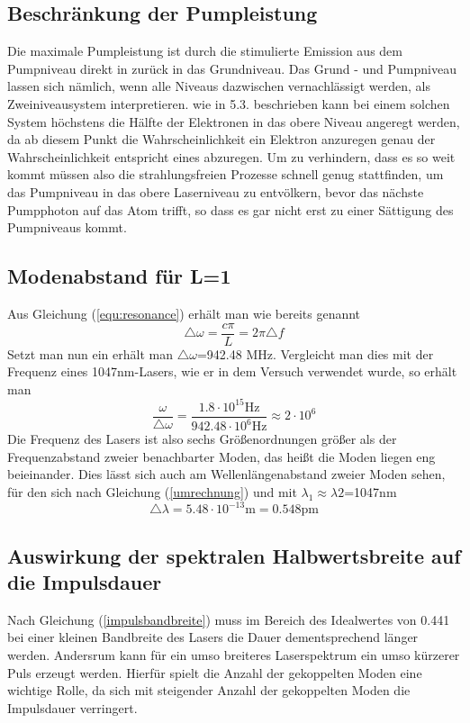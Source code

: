\subsection{Beschränkung der Pumpleistung}
Die maximale Pumpleistung ist durch die stimulierte Emission aus dem Pumpniveau direkt in zurück in das Grundniveau. Das Grund - und Pumpniveau lassen sich nämlich, wenn alle Niveaus dazwischen vernachlässigt werden, als Zweiniveausystem interpretieren. wie in 5.3. beschrieben kann bei einem solchen System höchstens die Hälfte der Elektronen in das obere Niveau angeregt werden, da ab diesem Punkt die Wahrscheinlichkeit ein Elektron anzuregen genau der Wahrscheinlichkeit entspricht eines abzuregen. \newline
Um zu verhindern, dass es so weit kommt müssen also die strahlungsfreien Prozesse schnell genug stattfinden, um das Pumpniveau in das obere Laserniveau zu entvölkern, bevor das nächste Pumpphoton auf das Atom trifft, so dass es gar nicht erst zu einer Sättigung des Pumpniveaus kommt. 
\subsection{Modenabstand für L=1}
Aus Gleichung (\ref{equ:resonance}) erhält man wie bereits genannt
\begin{equation*}
	\triangle\omega=\frac{c\pi}{L}=2\pi\triangle f
\end{equation*}
Setzt man nun ein erhält man $\triangle\omega$=942.48 MHz. Vergleicht man dies mit der Frequenz eines 1047nm-Lasers, wie er in dem Versuch verwendet wurde, so erhält man
\begin{equation*}
\frac{\omega}{\triangle\omega}=\frac{1.8\cdot10^{15}\text{Hz}}{942.48\cdot10^6 \text{Hz}}\approx2\cdot10^6
\end{equation*}
Die Frequenz des Lasers ist also sechs Größenordnungen größer als der Frequenzabstand zweier benachbarter Moden, das heißt die Moden liegen eng beieinander. Dies lässt sich auch am Wellenlängenabstand zweier Moden sehen, für den sich nach Gleichung (\ref{umrechnung}) und mit $\lambda_1\approx\lambda2$=1047nm
\begin{equation*}
\triangle\lambda=5.48\cdot10^{-13}\text{m}=0.548 \text{pm}
\end{equation*}
\subsection{Auswirkung der spektralen Halbwertsbreite auf die Impulsdauer}
Nach Gleichung (\ref{impulsbandbreite}) muss im Bereich des Idealwertes von 0.441 bei einer kleinen Bandbreite des Lasers die Dauer dementsprechend länger werden. Andersrum kann für ein umso breiteres Laserspektrum ein umso kürzerer Puls erzeugt werden. Hierfür spielt die Anzahl der gekoppelten Moden eine wichtige Rolle, da sich mit steigender Anzahl der gekoppelten Moden die Impulsdauer verringert.
